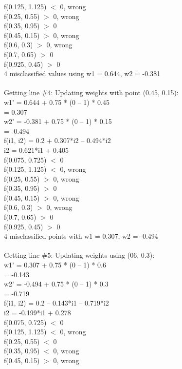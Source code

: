 \documentclass{article}
\begin{document}
f(0.125, 1.125) $<$ 0, wrong
\\
f(0.25, 0.55) $>$ 0, wrong
\\
f(0.35, 0.95) $>$ 0
\\
f(0.45, 0.15) $>$ 0, wrong
\\
f(0.6, 0.3) $>$ 0, wrong
\\
f(0.7, 0.65) $>$ 0
\\
f(0.925, 0.45) $>$ 0
\\
4 misclassified values using w1 = 0.644, w2 = -0.381
\\
\\
{\LARGE Getting line \#4:}
Updating weights with point (0.45, 0.15):
\\
w1’ = 0.644 + 0.75 * (0 – 1) * 0.45
\\
	= 0.307
\\
w2’ = -0.381 + 0.75 * (0 – 1) * 0.15
\\
	= -0.494
\\
f(i1, i2) = 0.2 + 0.307*i2 – 0.494*i2
\\
i2 = 0.621*i1 + 0.405
\\
f(0.075, 0.725) $<$ 0
\\
f(0.125, 1.125) $<$ 0, wrong
\\
f(0.25, 0.55) $>$ 0, wrong
\\
f(0.35, 0.95) $>$ 0
\\
f(0.45, 0.15) $>$ 0, wrong
\\
f(0.6, 0.3) $>$ 0, wrong
\\
f(0.7, 0.65) $>$ 0
\\
f(0.925, 0.45) $>$ 0
\\
4 misclassified points with w1 = 0.307, w2 = -0.494
\\
\\
{\LARGE Getting line \#5:}
Updating weights using (06, 0.3):
\\
w1’ = 0.307 + 0.75 * (0 – 1) * 0.6
\\
	= -0.143
\\
w2’ = -0.494 + 0.75 * (0 – 1) * 0.3
\\
	= -0.719
\\
f(i1, i2) = 0.2 – 0.143*i1 – 0.719*i2
\\
i2 = -0.199*i1 + 0.278
\\
f(0.075, 0.725) $<$ 0
\\
f(0.125, 1.125) $<$ 0, wrong
\\
f(0.25, 0.55) $<$ 0
\\
f(0.35, 0.95) $<$ 0, wrong
\\
f(0.45, 0.15) $>$ 0, wrong
\end{document}
